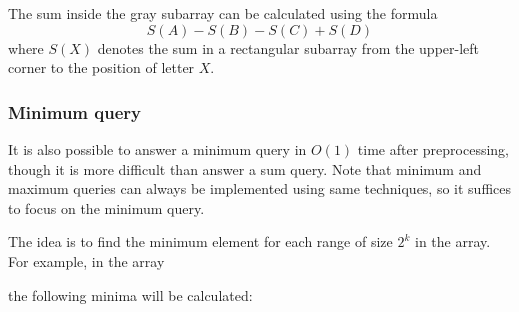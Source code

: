 The sum inside the gray subarray can be calculated
using the formula
\[S(A) - S(B) - S(C) + S(D)\]
where $S(X)$ denotes the sum in a rectangular
subarray from the upper-left corner
to the position of letter $X$.

\subsubsection{Minimum query}

It is also possible to answer a minimum query
in $O(1)$ time after preprocessing, though it is
more difficult than answer a sum query.
Note that minimum and maximum queries can always
be implemented using same techniques,
so it suffices to focus on the minimum query.

The idea is to find the minimum element for each range
of size $2^k$ in the array.
For example, in the array

\begin{center}
\end{center}
the following minima will be calculated:

